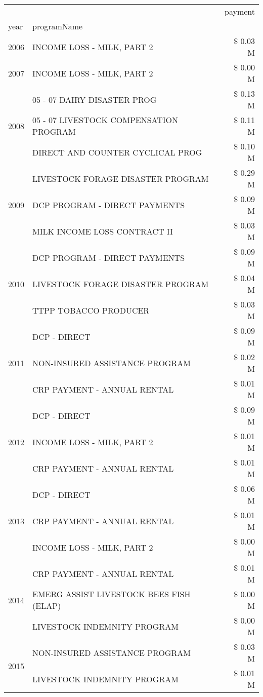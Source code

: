 \begin{tabular}{llr}
\toprule
 &  & payment \\
year & programName &  \\
\midrule
2006 & INCOME LOSS - MILK, PART 2 & \$ 0.03 M \\
\cline{1-3}
2007 & INCOME LOSS - MILK, PART 2 & \$ 0.00 M \\
\cline{1-3}
\multirow[t]{3}{*}{2008} & 05 - 07 DAIRY DISASTER PROG & \$ 0.13 M \\
 & 05 - 07 LIVESTOCK COMPENSATION PROGRAM & \$ 0.11 M \\
 & DIRECT AND COUNTER CYCLICAL PROG & \$ 0.10 M \\
\cline{1-3}
\multirow[t]{3}{*}{2009} & LIVESTOCK FORAGE DISASTER  PROGRAM & \$ 0.29 M \\
 & DCP PROGRAM - DIRECT PAYMENTS & \$ 0.09 M \\
 & MILK INCOME LOSS CONTRACT II & \$ 0.03 M \\
\cline{1-3}
\multirow[t]{3}{*}{2010} & DCP PROGRAM - DIRECT PAYMENTS & \$ 0.09 M \\
 & LIVESTOCK FORAGE DISASTER  PROGRAM & \$ 0.04 M \\
 & TTPP TOBACCO PRODUCER & \$ 0.03 M \\
\cline{1-3}
\multirow[t]{3}{*}{2011} & DCP - DIRECT & \$ 0.09 M \\
 & NON-INSURED ASSISTANCE PROGRAM & \$ 0.02 M \\
 & CRP PAYMENT - ANNUAL RENTAL & \$ 0.01 M \\
\cline{1-3}
\multirow[t]{3}{*}{2012} & DCP - DIRECT & \$ 0.09 M \\
 & INCOME LOSS - MILK, PART 2 & \$ 0.01 M \\
 & CRP PAYMENT - ANNUAL RENTAL & \$ 0.01 M \\
\cline{1-3}
\multirow[t]{3}{*}{2013} & DCP - DIRECT & \$ 0.06 M \\
 & CRP PAYMENT - ANNUAL RENTAL & \$ 0.01 M \\
 & INCOME LOSS - MILK, PART 2 & \$ 0.00 M \\
\cline{1-3}
\multirow[t]{3}{*}{2014} & CRP PAYMENT - ANNUAL RENTAL & \$ 0.01 M \\
 & EMERG ASSIST LIVESTOCK BEES FISH (ELAP) & \$ 0.00 M \\
 & LIVESTOCK INDEMNITY PROGRAM & \$ 0.00 M \\
\cline{1-3}
\multirow[t]{3}{*}{2015} & NON-INSURED ASSISTANCE PROGRAM & \$ 0.03 M \\
 & LIVESTOCK INDEMNITY PROGRAM & \$ 0.01 M \\

\end{tabular}
